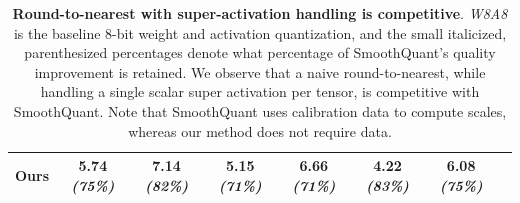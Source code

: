 \documentclass{article} %
\begin{document}
\begin{table}[t]
\begin{tabular}{l ccccccc}
        Ours & \textbf{5.74} \textit{\scriptsize(75\%)\hspace{1pt}} & \textbf{7.14} \textit{\scriptsize(82\%)\hspace{1pt}} & \textbf{5.15} \textit{\scriptsize(71\%)\hspace{1pt}} & \textbf{6.66} \textit{\scriptsize(71\%)\hspace{1pt}} & \textbf{4.22} \textit{\scriptsize(83\%)\hspace{1pt}} & \textbf{6.08} \textit{\scriptsize(75\%)\hspace{1pt}} \\
        \bottomrule
    \end{tabular}
    \caption{\textbf{Round-to-nearest with super-activation handling is competitive}. \textit{W8A8} is the baseline 8-bit weight and activation quantization, and the small italicized, parenthesized percentages denote what percentage of SmoothQuant's quality improvement is retained. We observe that a naive round-to-nearest, while handling a single scalar super activation per tensor, is competitive with SmoothQuant. Note that SmoothQuant uses calibration data to compute scales, whereas our method does not require data.}
    \label{tab:act_quant_results_llama}
\end{table}
\end{document}
